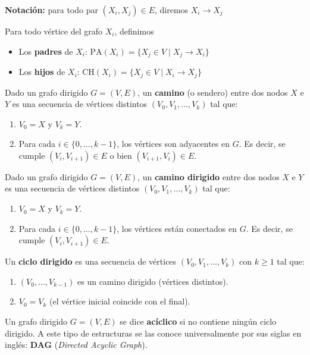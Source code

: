 \textbf{Notación:} para todo par $(X_i, X_j) \in E$, diremos $X_i \rightarrow X_j$

\begin{defin}[Parentesco]
Para todo vértice del grafo $X_i$, definimos
\begin{itemize}
\item Los \textbf{padres} de $X_i$: $\text{PA}(X_i)=\{X_j \in V \mid X_j \rightarrow X_i \}$
\item Los \textbf{hijos} de $X_i$: $\text{CH}(X_i)=\{X_j \in V \mid X_i \rightarrow X_j \}$
\end{itemize}
\label{def:parentesco}
\end{defin}

\begin{defin}[Camino]
Dado un grafo dirigido $G=(V,E)$, un \textbf{camino} (o sendero) entre dos nodos $X$ e $Y$ es una secuencia de vértices distintos $(V_0,V_1,\ldots,V_k)$ tal que:
\begin{enumerate}
\item $V_0=X$ y $V_k=Y$.
\item Para cada $i \in \{0,\ldots,k-1\}$, los vértices son adyacentes en $G$. Es decir, se cumple $(V_i,V_{i+1}) \in E$ o bien $(V_{i+1},V_i)\in E$.
\end{enumerate}
\label{def:camino}
\end{defin}

\begin{defin}
Dado un grafo dirigido $G=(V,E)$, un \textbf{camino dirigido} entre dos nodos $X$ e $Y$ es una secuencia de vértices distintos $(V_0,V_1,\ldots,V_k)$ tal que:
\begin{enumerate}
\item $V_0=X$ y $V_k=Y$.
\item Para cada $i \in \{0,\ldots,k-1\}$, los vértices están conectados en $G$. Es decir, se cumple $(V_i,V_{i+1}) \in E$.
\end{enumerate}
\end{defin}

\begin{defin}
Un \textbf{ciclo dirigido} es una secuencia de vértices $(V_0, V_1, \ldots, V_k)$ con $k \geq 1$ tal que:
\begin{enumerate}
    \item $(V_0, \ldots, V_{k-1})$ es un camino dirigido (vértices distintos).
    \item $V_0 = V_k$ (el vértice inicial coincide con el final).
\end{enumerate}
\end{defin}

\begin{defin}
Un grafo dirigido $G = (V, E)$ se dice \textbf{acíclico} si no contiene ningún ciclo dirigido.
A este tipo de estructuras se las conoce universalmente por sus siglas en inglés: \textbf{DAG} (\textit{Directed Acyclic Graph}).
\end{defin}